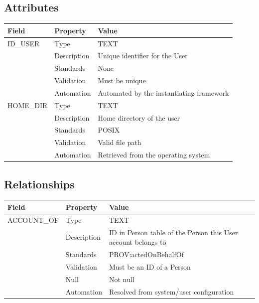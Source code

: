 \subsection{Attributes}\label{attributes-31}

\begin{longtable}[]{@{}lll@{}}
\toprule\noalign{}
Field & Property & Value \\
\midrule\noalign{}
\endhead
\bottomrule\noalign{}
\endlastfoot
ID\_USER & Type & TEXT \\
& Description & Unique identifier for the User \\
& Standards & None \\
& Validation & Must be unique \\
& Automation & Automated by the instantiating framework \\
HOME\_DIR & Type & TEXT \\
& Description & Home directory of the user \\
& Standards & POSIX \\
& Validation & Valid file path \\
& Automation & Retrieved from the operating system \\
\end{longtable}

\subsection{Relationships}\label{relationships-30}

\begin{longtable}[]{@{}
  >{\raggedright\arraybackslash}p{}
  >{\raggedright\arraybackslash}p{}
  >{\raggedright\arraybackslash}p{}@{}}
\toprule\noalign{}
\begin{minipage}[b]{\linewidth}\raggedright
Field
\end{minipage} & \begin{minipage}[b]{\linewidth}\raggedright
Property
\end{minipage} & \begin{minipage}[b]{\linewidth}\raggedright
Value
\end{minipage} \\
\midrule\noalign{}
\endhead
\bottomrule\noalign{}
\endlastfoot
ACCOUNT\_OF & Type & TEXT \\
& Description & ID in Person table of the Person this User account
belongs to \\
& Standards & PROV:actedOnBehalfOf \\
& Validation & Must be an ID of a Person \\
& Null & Not null \\
& Automation & Resolved from system/user configuration \\
\end{longtable}

